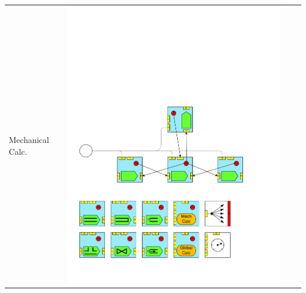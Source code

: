 \begin{table}
\begin{center}
\begin{tabular}{|p{2cm}|c|p{2cm}|c|}
Mechanical Calc.	    &\includegraphics[page=17, scale=0.25]{./figs/1dcfd/ElementalProcessors.pdf} &

\end{tabular}
\end{center}
\end{table}
